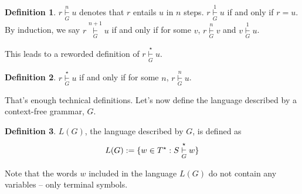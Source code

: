\documentclass[]{article}
\DeclarePairedDelimiter{\set}{\lbrace}{\rbrace}
\theoremstyle{definition}
\newtheorem*{defn}{Definition}
\begin{document}
        \begin{defn}
          $r \underset{G}{\overset{n}{\vdash}} u$ denotes that $r$ entails $u$ in $n$ steps. $r \underset{G}{\overset{1}{\vdash}} u$ if and only if $r = u$. By induction, we say $r \underset{G}{\overset{n+1}{\vdash}} u$ if and only if for some $v$, $r \underset{G}{\overset{n}{\vdash}} v$ and $v \underset{G}{\overset{1}{\vdash}} u$.
        \end{defn}

        This leads to a reworded definition of $r \underset{G}{\overset{\star}{\vdash}} u$.
        \begin{defn}
          $r \underset{G}{\overset{\star}{\vdash}} u$ if and only if for some $n$, $r \underset{G}{\overset{n}{\vdash}} u$.
        \end{defn}

        That's enough technical definitions. Let's now define the language described by a context-free grammar, $G$.

        \begin{defn}
          $L(G)$, the language described by $G$, is defined as
          $$
            L(G) := \set{ w \in T^\star : S \underset{G}{\overset{\star}{\vdash}} w}
          $$
        \end{defn}

        Note that the words $w$ included in the language $L(G)$ do not contain any variables -- only terminal symbols.
\end{document}
